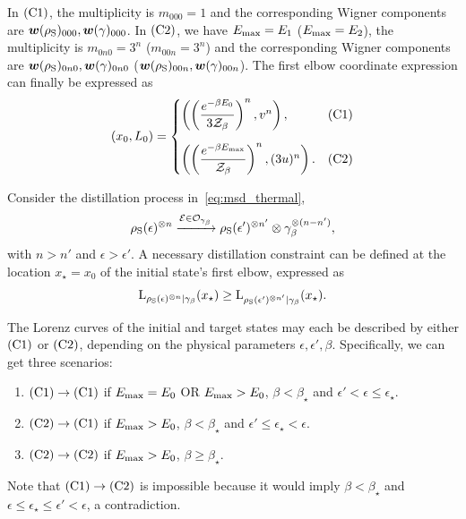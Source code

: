 \documentclass[pra,
aps,
twocolumn,
superscriptaddress,
groupedaddress,
nofootinbib,
reprint
]{revtex4-1}
\begin{document}
In $\rm{(C1)}$, the multiplicity is $m_{000} = 1$ and the corresponding Wigner components are $\bm{w}(\rho_{\rm{S}})_{000}, \bm{w}(\gamma)_{000}$.
In $\rm{(C2)}$, we have $E_{\rm{max}} = E_1$ ($E_{\rm{max}} = E_2$), the multiplicity is $m_{0n0} = 3^n$ ($m_{00n} = 3^n$) and the corresponding Wigner components are $\bm{w}(\rho_{\rm{S}})_{0n0}, \bm{w}(\gamma)_{0n0}$ ($\bm{w}(\rho_{\rm{S}})_{00n}, \bm{w}(\gamma)_{00n}$).
The first elbow coordinate expression can finally be expressed as
\begin{equation}\label{eq:first_elb_coords}
	(x_0, L_0) =
	\begin{cases}
		\left( \left(\dfrac{e^{-\beta E_0}}{3\Z_\beta}\right)^n, v^n \right), &\rm{(C1)}	\vspace{10pt}\\
		\left( \left(\dfrac{e^{-\beta E_{\rm{max}}}}{\Z_\beta}\right)^n, (3u)^n \right). &\rm{(C2)} 
	\end{cases}
\end{equation}

Consider the distillation process in~\cref{eq:msd_thermal},
\begin{equation*}
		\rho_{\rm{S}}(\epsilon)^{\otimes n} \xrightarrow{\mathcal{E} \in \mathcal{O}_{\gamma_\beta}} \rho_{\rm{S}}(\epsilon')^{\otimes n'} \otimes \gamma_\beta^{\otimes (n-n')},
\end{equation*}
with $n > n'$ and $\epsilon > \epsilon'$.
A necessary distillation constraint can be defined at the location $x_\star = x_0$ of the initial state's first elbow, expressed as
\begin{equation}\label{eq:first_elbow_constraint}
	{{\rm{L}}_{\rho_{\rm{S}}(\epsilon)^{\otimes n}|\gamma_\beta}}(x_\star) \geq {{\rm{L}}_{\rho_{\rm{S}}(\epsilon')^{\otimes n'}|\gamma_\beta}}(x_\star).
\end{equation}

The Lorenz curves of the initial and target states may each be described by either $\rm{(C1)}$ or $\rm{(C2)}$, depending on the physical parameters $\epsilon, \epsilon', \beta$.
Specifically, we can get three scenarios:
\begin{enumerate}
	\item $\rm{(C1)} \rightarrow \rm{(C1)}$ if $E_{\rm{max}} = E_0$ OR $E_{\rm{max}} > E_0$, $\beta < \beta_{\star}$ and $\epsilon' < \epsilon  \leq \epsilon_{\star}$.
	\item $\rm{(C2)} \rightarrow \rm{(C1)}$ if $E_{\rm{max}} > E_0$, $\beta < \beta_{\star}$ and $\epsilon' \leq \epsilon_{\star} < \epsilon$.
	\item $\rm{(C2)} \rightarrow \rm{(C2)}$ if $E_{\rm{max}} > E_0$, $\beta \geq \beta_{\star}$.
\end{enumerate}
Note that $\rm{(C1)} \rightarrow \rm{(C2)}$ is impossible because it would imply $\beta < \beta_{\star}$ and $\epsilon \leq \epsilon_{\star} \leq \epsilon' < \epsilon$, a contradiction.
\end{document}
